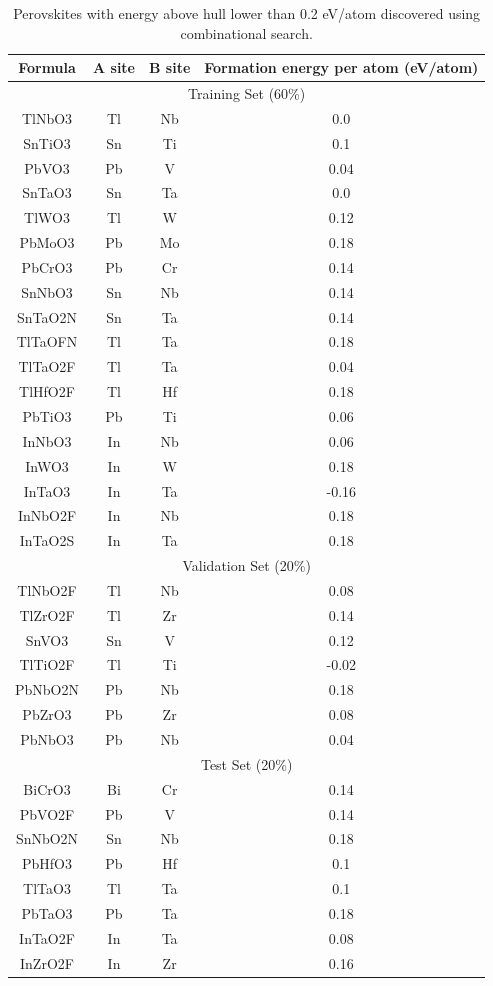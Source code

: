 \documentclass[twocolumn, prl]{revtex4-1}
\begin{document}
\begin{table}[h]%
\caption{Perovskites with energy above hull lower than 0.2 eV/atom discovered using combinational search. }
\begin{ruledtabular}
\begin{tabular}{cccc}
  Formula &   A site   & B site   & Formation energy per atom (eV/atom)   \\
  \hline

\multicolumn{4}{c}{Training Set (60\%)} \\
  \hline
  TlNbO3 & Tl & Nb & 0.0 \\
  SnTiO3 & Sn & Ti & 0.1 \\
  PbVO3 & Pb & V & 0.04 \\
  SnTaO3 & Sn & Ta & 0.0 \\
  TlWO3 & Tl & W & 0.12 \\
  PbMoO3 & Pb & Mo & 0.18 \\
  PbCrO3 & Pb & Cr & 0.14 \\
  SnNbO3 & Sn & Nb & 0.14 \\
  SnTaO2N & Sn & Ta & 0.14 \\
  TlTaOFN & Tl & Ta & 0.18 \\
  TlTaO2F & Tl & Ta & 0.04 \\
  TlHfO2F & Tl & Hf & 0.18 \\
  PbTiO3 & Pb & Ti & 0.06 \\
  InNbO3 & In & Nb & 0.06 \\
  InWO3 & In & W & 0.18 \\
  InTaO3 & In & Ta & -0.16 \\
  InNbO2F & In & Nb & 0.18 \\
  InTaO2S & In & Ta & 0.18 \\
\hline
\multicolumn{4}{c}{Validation Set (20\%)} \\
  \hline
  TlNbO2F & Tl & Nb & 0.08 \\
  TlZrO2F & Tl & Zr & 0.14 \\
  SnVO3 & Sn & V & 0.12 \\
  TlTiO2F & Tl & Ti & -0.02 \\
  PbNbO2N & Pb & Nb & 0.18 \\
  PbZrO3 & Pb & Zr & 0.08 \\
  PbNbO3 & Pb & Nb & 0.04 \\

\hline
\multicolumn{4}{c}{Test Set (20\%)} \\
  \hline
  BiCrO3 & Bi & Cr & 0.14 \\
  PbVO2F & Pb & V & 0.14 \\
  SnNbO2N & Sn & Nb & 0.18 \\
  PbHfO3 & Pb & Hf & 0.1 \\
  TlTaO3 & Tl & Ta & 0.1 \\
  PbTaO3 & Pb & Ta & 0.18 \\
  InTaO2F & In & Ta & 0.08 \\
  InZrO2F & In & Zr & 0.16 \\


\end{tabular}
\end{ruledtabular}
\end{table}
\end{document}
